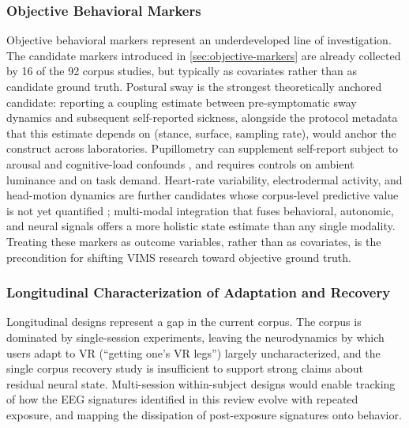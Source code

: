 \subsubsection{Objective Behavioral Markers}
Objective behavioral markers represent an underdeveloped line of investigation.
The candidate markers introduced in \autoref{sec:objective-markers} are already collected by 16 of the 92 corpus studies, but typically as covariates rather than as candidate ground truth.
Postural sway is the strongest theoretically anchored candidate: reporting a coupling estimate between pre-symptomatic sway dynamics and subsequent self-reported sickness, alongside the protocol metadata that this estimate depends on (stance, surface, sampling rate), would anchor the construct across laboratories.
Pupillometry can supplement self-report subject to arousal and cognitive-load confounds \cite{kourtesisCybersicknessVirtualReality2023}, and requires controls on ambient luminance and on task demand.
Heart-rate variability, electrodermal activity, and head-motion dynamics are further candidates whose corpus-level predictive value is not yet quantified \cite{islamAutomaticDetectionPrediction2020, tianWhoSaysYou2024, yangPredictionDetectionVirtual2023}; multi-modal integration that fuses behavioral, autonomic, and neural signals offers a more holistic state estimate than any single modality.
Treating these markers as outcome variables, rather than as covariates, is the precondition for shifting VIMS research toward objective ground truth.

\subsubsection{Longitudinal Characterization of Adaptation and Recovery}
Longitudinal designs represent a gap in the current corpus.
The corpus is dominated by single-session experiments, leaving the neurodynamics by which users adapt to VR (``getting one's VR legs'') largely uncharacterized, and the single corpus recovery study \cite{wooRecoveryTimeVR2023} is insufficient to support strong claims about residual neural state.
Multi-session within-subject designs would enable tracking of how the EEG signatures identified in this review evolve with repeated exposure, and mapping the dissipation of post-exposure signatures onto behavior.
